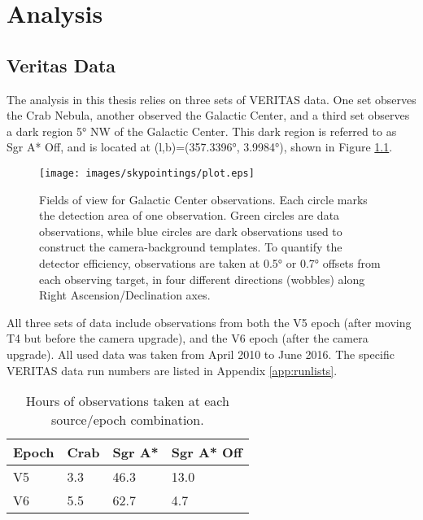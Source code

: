 \cleartooddpage[\thispagestyle{empty}]
\chapter{Analysis}\label{chapter:analysis}

\section{Veritas Data}\label{veritasdata}
  The analysis in this thesis relies on three sets of VERITAS data.
  One set observes the Crab Nebula, another observed the Galactic Center, and a third set observes a dark region \nicetilde\ang{5} NW of the Galactic Center.
  This dark region is referred to as  Sgr A* Off, and is located at (l,b)=(\ang{357.3396}, \ang{3.9984}), shown in Figure \ref{fig:gcfieldsofview}.

  \begin{figure}[ht]
    \centering
    \texttt{[image: images/skypointings/plot.eps]}
    \caption[VERITAS Galactic Center Pointings]{
      Fields of view for Galactic Center observations.
      Each circle marks the detection area of one observation.
      Green circles are data observations, while blue circles are dark observations used to construct the camera-background templates.
      To quantify the detector efficiency, observations are taken at \ang{0.5} or \ang{0.7} offsets from each observing target, in four different directions (wobbles) along Right Ascension/Declination axes.
    }
    \label{fig:gcfieldsofview}
  \end{figure}


  All three sets of data include observations from both the V5 epoch (after moving T4 but before the camera upgrade), and the V6 epoch (after the camera upgrade).
  All used data was taken from April 2010 to June 2016.
  The specific VERITAS data run numbers are listed in Appendix \ref{app:runlists}.

  \begin{table}[]
    \centering
    \caption{Hours of observations taken at each source/epoch combination.}
    \label{tab:observation_times}
    \begin{tabular}{|l|l|l|l|}
      \hline
      \textbf{Epoch} & \textbf{Crab} & \textbf{Sgr A*} & \textbf{Sgr A* Off} \\ \hline
      V5             & 3.3           & 46.3            & 13.0                \\ \hline
      V6             & 5.5           & 62.7            & 4.7                 \\ \hline
    \end{tabular}
  \end{table}



